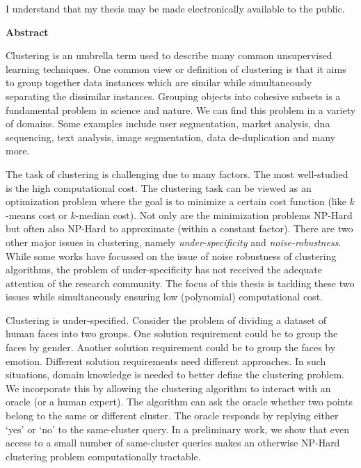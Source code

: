 \documentclass[letterpaper,12pt,titlepage,oneside,final]{book}
\let\origdoublepage\cleardoublepage
\newcommand{\clearemptydoublepage}{%
  \clearpage{\pagestyle{empty}\origdoublepage}}
\let\cleardoublepage\clearemptydoublepage
\begin{document}
  \bigskip
  
  \noindent
I understand that my thesis may be made electronically available to the public.

\cleardoublepage

\begin{center}\textbf{Abstract}\end{center}
Clustering is an umbrella term used to describe many common unsupervised learning techniques. One common view or definition of clustering is that it aims to group together data instances which are similar while simultaneously separating the dissimilar instances. Grouping objects into cohesive subsets is a fundamental problem in science and nature. We can find this problem in a variety of domains. Some examples include user segmentation, market analysis, dna sequencing, text analysis, image segmentation, data de-duplication and many more.  

The task of clustering is challenging due to many factors. The most well-studied is the high computational cost. The clustering task can be viewed as an optimization problem where the goal is to minimize a certain cost function (like $k$-means cost or $k$-median cost). Not only are the minimization problems NP-Hard but often also NP-Hard to approximate (within a constant factor). There are two other major issues in clustering, namely \emph{under-specificity} and \emph{noise-robustness}. While some works have focussed on the issue of noise robustness of clustering algorithms, the problem of under-specificity has not received the adequate attention of the research community. The focus of this thesis is tackling these two issues while simultaneously ensuring low (polynomial) computational cost. 

Clustering is under-specified. Consider the problem of dividing a dataset of human faces into two groups. One solution requirement could be to group the faces by gender. Another solution requirement could be to group the faces by emotion. Different solution requirements need different approaches. In such situations, domain knowledge is needed to better define the clustering problem. We incorporate this by allowing the clustering algorithm to interact with an oracle (or a human expert). The algorithm can ask the oracle whether two points belong to the same or different cluster. The oracle responds by replying either `yes' or `no' to the same-cluster query. In a preliminary work, we show that even access to a small number of same-cluster queries makes an otherwise NP-Hard clustering problem computationally tractable. 
\end{document}
